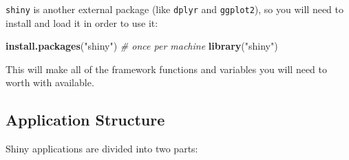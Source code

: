 \documentclass[]{book}
\newenvironment{Shaded}{\begin{snugshade}}{\end{snugshade}}
\newcommand{\KeywordTok}[1]{\textcolor[rgb]{0.13,0.29,0.53}{\textbf{#1}}}
\newcommand{\StringTok}[1]{\textcolor[rgb]{0.31,0.60,0.02}{#1}}
\newcommand{\CommentTok}[1]{\textcolor[rgb]{0.56,0.35,0.01}{\textit{#1}}}
\newcommand{\NormalTok}[1]{#1}
\theoremstyle{definition}
\theoremstyle{definition}
\theoremstyle{remark}
\begin{document}
\texttt{shiny} is another external package (like \texttt{dplyr} and
\texttt{ggplot2}), so you will need to install and load it in order to
use it:

\begin{Shaded}
\begin{Highlighting}[]
\KeywordTok{install.packages}\NormalTok{(}\StringTok{"shiny"}\NormalTok{)  }\CommentTok{# once per machine}
\KeywordTok{library}\NormalTok{(}\StringTok{"shiny"}\NormalTok{)}
\end{Highlighting}
\end{Shaded}

This will make all of the framework functions and variables you will
need to worth with available.

\subsection{Application Structure}\label{application-structure}

Shiny applications are divided into two parts:
\end{document}
